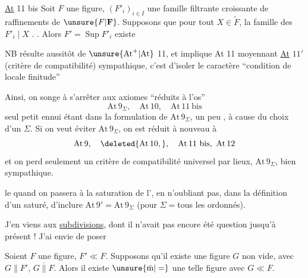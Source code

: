 \uline{At} 11 bis \quad Soit $F$ une figure, $(F'_i)_{i\in I}$ une famille filtrante croissante de raffinements de $\unsure{F|\mathbf{F}}$. Supposons que pour tout $X\in\widetilde F$, la famille des $F'_i\mid X$ . . Alors $F'=\operatorname{Sup} F'_i$ existe

NB \quad {} résulte aussitôt de \uline{$\unsure{\mathrm{At}^{+}|\mathrm{At}}$} 11, et  implique At 11 moyennant \uline{At} $11'$ (critère de compatibilité)    sympathique, c'est d'isoler le caractère ``condition de locale finitude''

Ainsi, on songe à s'arrêter aux axiomes ``réduits à l'os''
\[
\mathrm{At}\,9_{\Sigma},\quad \mathrm{At}\,10,\quad \mathrm{At}\,11\ \text{bis}
\]
 seul petit ennui étant dans la formulation de $\mathrm{At}\,9_{\Sigma}$, un peu , à cause du choix d'un $\Sigma$. Si on veut éviter $\mathrm{At}\,9_{\Sigma}$, on est réduit à nouveau à
\[
\mathrm{At}\,9,\quad \deleted{\mathrm{At}\,10,},\quad \mathrm{At}\,11\ \text{bis},\ \mathrm{At}\,12
\]
et on perd seulement un critère de compatibilité universel par lieux, $\mathrm{At}\,9_{\Sigma}$, bien sympathique.

  le  quand on passera à la saturation de l',  en n'oubliant pas, dans la définition d'un  saturé, d'inclure $\mathrm{At}\,9'=\mathrm{At}\,9_{\Sigma}$ (pour $\Sigma={}$tous les  ordonnés).

J'en viens aux  \uline{subdivisions}, dont il n'avait pas encore été question jusqu'à présent ! J'ai envie de poser

  \quad Soient $F$ une figure, $F'\ll F$. Supposons qu'il existe une figure $G$ non vide, avec $G\parallel F'$, $G\mathrel{\overline{\parallel}}F$. Alors il existe $\unsure{\bar{\text{m}}|=}$ une telle figure avec $G\ll F$.


